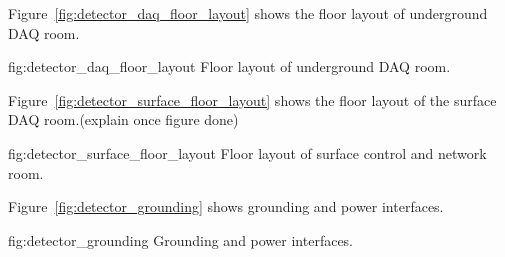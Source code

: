 Figure~\ref{fig:detector_daq_floor_layout} shows the floor layout of underground DAQ room.
\begin{dunefigure}{fig:detector_daq_floor_layout}
  {Floor layout of underground DAQ room.}
\end{dunefigure}
Figure~\ref{fig:detector_surface_floor_layout} shows the floor layout
of the surface DAQ room.(explain once figure done)
\begin{dunefigure}{fig:detector_surface_floor_layout} {Floor layout of surface control and network room.}
\end{dunefigure}
Figure~\ref{fig:detector_grounding} shows grounding and power interfaces.
\begin{dunefigure}{fig:detector_grounding} {Grounding and power interfaces.}
\end{dunefigure}
